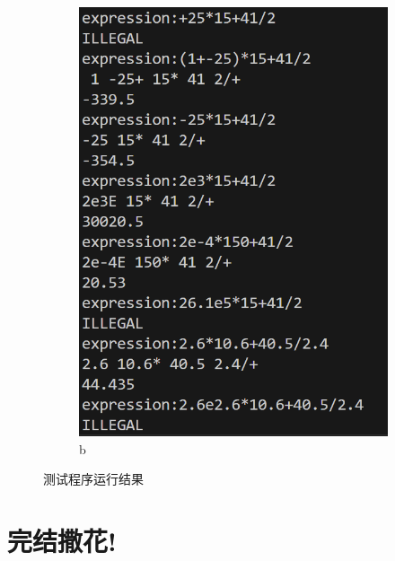 \documentclass[UTF8]{ctexart}
\begin{document}
\begin{figure}[H]
\begin{subfigure}[b]{0.4\textwidth}
        \includegraphics[width=\textwidth]{result2.png}
        \caption{b}
        \label{fig:result2}
    \end{subfigure}
    \caption{测试程序运行结果}
    \label{fig:results}
\end{figure}




\section*{完结撒花!}
\end{document}
